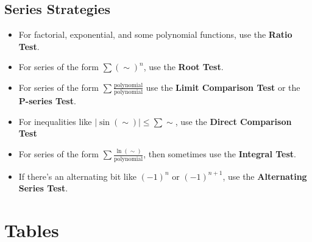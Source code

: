 \documentclass[12pt]{report}
\begin{document}
\pagebreak


\section{Series Strategies}

\begin{itemize}
	
	\item[] For factorial, exponential, and some polynomial functions, use the \textbf{Ratio Test}.

	\item[] For series of the form $ \sum \left( \sim \right)^n $, use the \textbf{Root Test}.

	\item[] For series of the form $ \sum \frac{\text{polynomial}}{\text{polynomial}} $ use the \textbf{Limit Comparison Test} or the \textbf{P-series Test}.

	\item[] For inequalities like $ \left| \sin(\sim) \right| \leq \sum \sim $, use the \textbf{Direct Comparison Test}

	\item[] For series of the form $ \sum \frac{\ln(\sim)}{\text{polynomial}} $, then sometimes use the \textbf{Integral Test}.
	
	\item[] If there's an alternating bit like $ (-1)^n $ or $ (-1)^{n+1} $, use the \textbf{Alternating Series Test}.
\end{itemize}


\pagebreak


\chapter{Tables}
\end{document}
